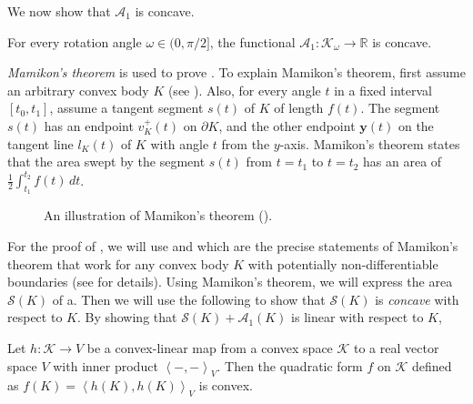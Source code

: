 We now show that \(\mathcal{A}_1\) is concave.

\begin{theorem}

For every rotation angle \(\omega \in (0, \pi/2]\), the functional \(\mathcal{A}_1 : \mathcal{K}_\omega \to \mathbb{R}\) is concave.

\label{thm:a1-negative-semidefinite}
\end{theorem}

\emph{Mamikon’s theorem} \autocite{mnatsakanianAnnularRingsEqual1997} is used to prove . To explain Mamikon’s theorem, first assume an arbitrary convex body \(K\) (see ). Also, for every angle \(t\) in a fixed interval \([t_0, t_1]\), assume a tangent segment \(s(t)\) of \(K\) of length \(f(t)\). The segment \(s(t)\) has an endpoint \(v_K^+(t)\) on \(\partial K\), and the other endpoint \(\mathbf{y}(t)\) on the tangent line \(l_K(t)\) of \(K\) with angle \(t\) from the \(y\)-axis. Mamikon’s theorem states that the area swept by the segment \(s(t)\) from \(t=t_1\) to \(t=t_2\) has an area of \(\frac{1}{2}\int_{t_1}^{t_2} f(t)\,dt\).

\begin{figure}
\centering

\caption{An illustration of Mamikon’s theorem ().}
\label{fig:mamikon}
\end{figure}

For the proof of , we will use  and  which are the precise statements of Mamikon’s theorem that work for any convex body \(K\) with potentially non-differentiable boundaries (see  for details). Using Mamikon’s theorem, we will express the area \(\mathcal{S}(K)\) of a. Then we will use the following  to show that \(\mathcal{S}(K)\) is \emph{concave} with respect to \(K\). By showing that \(\mathcal{S}(K) + \mathcal{A}_1(K)\) is linear with respect to \(K\),

\begin{lemma}

Let \(h : \mathcal{K} \to V\) be a convex-linear map from a convex space \(\mathcal{K}\) to a real vector space \(V\) with inner product \(\left< -, - \right>_V\). Then the quadratic form \(f\) on \(\mathcal{K}\) defined as \(f(K) = \left< h(K), h(K) \right>_V\) is convex.

\label{lem:sum-of-squares}
\end{lemma}

